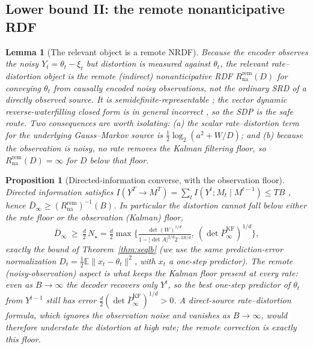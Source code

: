 \documentclass[11pt]{article}
\newtheorem{lemma}{Lemma}
\newtheorem{proposition}{Proposition}
\theoremstyle{definition}
\newcommand{\E}{\mathbb{E}}
\begin{document}
\subsection{Lower bound II: the remote nonanticipative RDF}\label{app:seqrd:lb2}
\begin{lemma}[The relevant object is a remote NRDF]
\label{lem:srd}
Because the encoder observes the \emph{noisy} $Y_t=\theta_t-\xi_t$ but distortion is measured against
$\theta_t$, the relevant rate--distortion object is the \emph{remote} (indirect) nonanticipative RDF
$R^{\mathrm{rem}}_{\mathrm{na}}(D)$ for conveying $\theta_t$ from causally encoded noisy observations,
not the ordinary SRD of a directly observed source. It is semidefinite-representable
\citep{tatikonda2009capacity,tanaka2017sdp}; the vector dynamic reverse-waterfilling \emph{closed form}
is in general incorrect \citep{stavrou2020revisited}, so the SDP is the safe route. Two consequences are
worth isolating: (a) the scalar rate--distortion \emph{term} for the underlying Gauss--Markov source is
$\tfrac12\log_2(a^2+W/D)$; and (b) because the observation is noisy, no rate removes the Kalman
filtering floor, so $R^{\mathrm{rem}}_{\mathrm{na}}(D)=\infty$ for $D$ below that floor.
\end{lemma}

\begin{proposition}[Directed-information converse, with the observation floor]
\label{thm:srdconverse}
Directed information satisfies $I(Y^T\!\to M^T)=\sum_t I(Y^t;M_t\mid M^{t-1})\le TB$
\citep{massey1990directed}, hence $\bar D_\infty\ge (R^{\mathrm{rem}}_{\mathrm{na}})^{-1}(B)$. In
particular the distortion cannot fall below \emph{either} the rate floor \emph{or} the observation
(Kalman) floor,
\[
\bar D_\infty\ \ge\ \tfrac d2\,N_\star
=\tfrac d2\max\Big\{\tfrac{\det(W)^{1/d}}{1-|\det A|^{2/d}2^{-2B/d}},\ (\det\bar P^{\mathrm{KF}}_\infty)^{1/d}\Big\},
\]
\emph{exactly the bound of Theorem~\ref{thm:seqlb}} (we use the same prediction-error normalization
$D_t=\tfrac12\E\|x_t-\theta_t\|^2$, with $x_t$ a one-step predictor). The remote (noisy-observation)
aspect is what keeps the Kalman floor present at every rate: even as $B\to\infty$ the decoder recovers
only $Y^t$, so the best one-step predictor of $\theta_t$ from $Y^{t-1}$ still has error
$\tfrac d2(\det\bar P^{\mathrm{KF}}_\infty)^{1/d}>0$. A \emph{direct}-source rate--distortion formula,
which ignores the observation noise and vanishes as $B\to\infty$, would therefore understate the
distortion at high rate; the remote correction is exactly this floor.
\end{proposition}
\end{document}
